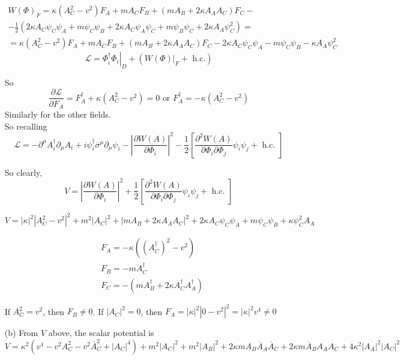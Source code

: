 \documentclass[twoside]{amsart}
\begin{document}
\begin{enumerate}
\[
\begin{gathered}
  W(\Phi)_F = \kappa (A_C^2 - v^2) F_A + m A_C F_B + (m A_B + 2 \kappa A_A A_C ) F_C - \\
  - \frac{1}{2} \left( 2 \kappa A_C \psi_C \psi_A + m \psi_C \psi_B + 2 \kappa A_C \psi_A \psi_C + m \psi_B \psi_C + 2\kappa A_A\psi^2_C \right) = \\
  = \kappa (A_C^2 - v^2)F_A + mA_C F_B + (m A_B + 2\kappa A_A A_C) F_C - 2\kappa A_C \psi_C \psi_A - m \psi_C \psi_B - \kappa A_A\psi_C^2
\end{gathered}
\]
\[
\mathcal{L} = \left. \Phi_i^{\dag} \Phi_i \right|_D + (  \left. W(\Phi) \right|_F + \text{ h.c.})
\]

So
\[
\frac{  \partial \mathcal{L}}{ \partial F_A } = F_A^{\dag} + \kappa (A_C^2 - v^2) = 0 \text{ or } F_A^{\dag} = - \kappa (A_C^2 - v^2)
\]
Similarly for the other fields.   \\

So recalling 
\[
\mathcal{L} = - \partial^{\mu} A_i^{\dag} \partial_{\mu} A_i + i \psi_i^{\dag} \overline{\sigma}^{\mu} \partial_{\mu} \psi_i - \left| \frac{ \partial W(A) }{ \partial \Phi_i } \right|^2 - \frac{1}{2} \left[ \frac{ \partial^2 W(A) }{ \partial \Phi_i \partial \Phi_j } \psi_i \psi_j + \text{ h.c. } \right]
\]

So clearly, 
\[
V = \left| \frac{ \partial W(A) }{ \partial \Phi_i } \right|^2 + \frac{1}{2} \left[ \frac{ \partial^2 W(A) }{ \partial \Phi_i \partial \Phi_j } \psi_i \psi_j + \text{ h.c. } \right]
\]

\[
V = | \kappa |^2 | A_C^2 - v^2 |^2 + m^2 |A_C|^2 + | m A_B + 2\kappa A_A A_C |^2 + 2\kappa A_C \psi_C \psi_A + m\psi_C \psi_B + \kappa \psi_C^2 A_A
\]

\[
\begin{aligned}
  & F_A = - \kappa ((A_C^{\dag})^2 - v^2) \\ 
  & F_B = - m A_C^{\dag} \\ 
  & F_C = - ( mA_B^{\dag} + 2\kappa A^{\dag}_C A^{\dag}_A )
\end{aligned}
\]


If $A_C^2 = v^2$, then $F_B \neq 0$.  If $|A_C|^2 =0$, then $F_A = |\kappa|^2| 0 - v^2|^2 = |\kappa |^2 v^4 \neq 0$
\item[(b)] From $V$ above, the scalar potential is 
\[
V = \kappa^2( v^4 - v^2 A_C^2 - v^2 \overline{A}_C^2  + |A_C|^4 ) + m^2 |A_C|^2 + m^2 |A_B|^2 + 2\kappa m A_B \overline{A}_A \overline{A}_C + 2 \kappa m \overline{A}_B A_A A_C + 4 \kappa^2 |A_A|^2 |A_C|^2
\]


\end{enumerate}
\end{document}
